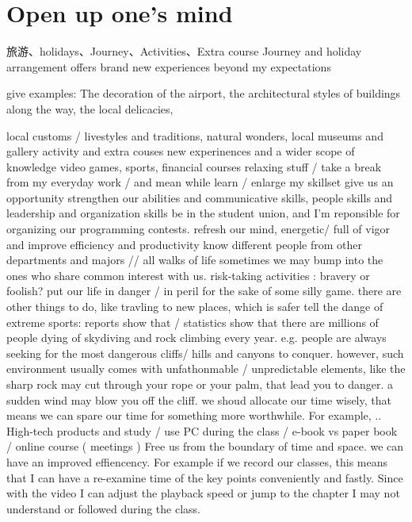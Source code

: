 \documentclass{ctexart}
\begin{document}
\section{Open up one's mind}
\begin{outline}
    \1 旅游、holidays、Journey、Activities、Extra course
    \1 Journey and holiday arrangement
        \2  offers brand new experiences beyond my expectations

            give examples: The decoration of the airport, the architectural styles of buildings along the way, the local delicacies,

            local customs / livestyles and traditions, natural wonders, local museums and gallery
    \1 activity and extra couses
        \2 new experinences and a wider scope of knowledge
            \3 video games, sports, financial courses
            \3 relaxing stuff / take a break from my everyday work / and mean while learn / enlarge my skillset
        \2 give us an opportunity strengthen our abilities and communicative skills, people skills and leadership and organization skills
            \3 be in the student union, and I'm reponsible for organizing our programming contests.
        \2 refresh our mind, energetic/ full of vigor and improve efficiency and productivity
        \2 know different people from other departments and majors // all walks of life
            \3 sometimes we may bump into the ones who share common interest with us.
    \1 risk-taking activities : bravery or foolish?
        \2 put our life in danger / in peril for the sake of some silly game.   
            \3 there are other things to do, like travling to new places, which is safer 
            \3 tell the dange of extreme sports: reports show that / statistics show that there are millions of people dying of skydiving and rock climbing every year. e.g. people are always seeking for the most dangerous cliffs/ hills and canyons to conquer. however, such environment usually comes with unfathonmable / unpredictable elements, like the sharp rock may cut through your rope or your palm, that lead you to danger. a sudden wind may blow you off the cliff.
            \3 we shoud allocate our time wisely, that means we can spare our time for something more worthwhile. For example, ..
    \1 High-tech products and study / use PC during the class / e-book vs paper book / online course ( meetings )
        \2 Free us from the boundary of time and space.
        \2 we can have an improved effiencency. For example if we record our classes, this means that I can have a re-examine time of the key points conveniently and fastly. Since with the video I can adjust the playback speed or jump to the chapter I may not understand or followed during the class. 

\end{outline}
\end{document}
